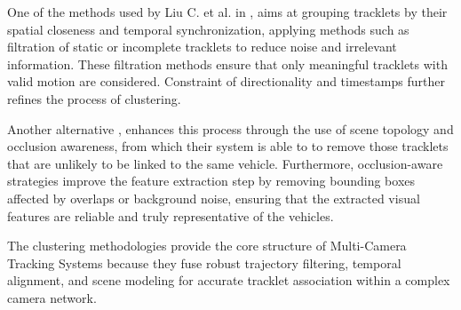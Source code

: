 One of the methods used by Liu C. et al. in \cite{CityScaleMTMC}, aims at grouping tracklets by their spatial closeness and temporal synchronization, applying methods such as filtration of static or incomplete tracklets to reduce noise and irrelevant information. These filtration methods ensure that only meaningful tracklets with valid motion are considered. Constraint of directionality and timestamps further refines the process of clustering.

Another alternative \cite{OcclusionAwareMTMCT}, enhances this process through the use of scene topology and occlusion awareness, from which their system is able to to remove those tracklets that are unlikely to be linked to the same vehicle. Furthermore, occlusion-aware strategies improve the feature extraction step by removing bounding boxes affected by overlaps or background noise, ensuring that the extracted visual features are reliable and truly representative of the vehicles.

The clustering methodologies provide the core structure of Multi-Camera Tracking Systems because they fuse robust trajectory filtering, temporal alignment, and scene modeling for accurate tracklet association within a complex camera network.
